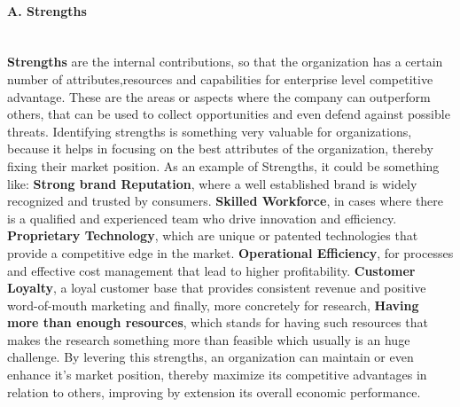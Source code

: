 \paragraph{A. Strengths}\mbox{}\\
\textbf{Strengths} are the internal contributions, so that the organization has a certain number of attributes,resources and capabilities 
for enterprise level competitive advantage. These are the areas or aspects where the company can outperform others, that can be used to 
collect opportunities and even defend against possible threats. Identifying strengths is something very valuable for organizations, because 
it helps in focusing on the best attributes of the organization, thereby fixing their market position. As an example of Strengths, it 
could be something like: \textbf{Strong brand Reputation}, where a well established brand is widely recognized and trusted by 
consumers. \textbf{Skilled Workforce}, in cases where there is a qualified and experienced team who drive innovation and efficiency. 
\textbf{Proprietary Technology}, which are unique or patented technologies that provide a competitive edge in the 
market. \textbf{Operational Efficiency}, for processes and effective cost management that lead to higher 
profitability. \textbf{Customer Loyalty}, a loyal customer base that provides consistent revenue and positive word-of-mouth marketing 
and finally, more concretely for research, \textbf{Having more than enough resources}, which stands for having such resources that makes 
the research something more than feasible which usually is an huge challenge. By levering this strengths, an organization can maintain or 
even enhance it's market position, thereby maximize its competitive advantages in relation to others, improving by extension its overall 
economic performance.

